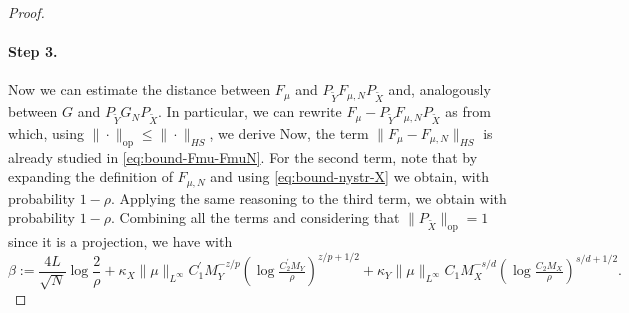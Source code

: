 \begin{proof}
\paragraph{Step 3.}
Now we can estimate the distance between $F_\mu$ and $P_{\tilde{Y}}F_{\mu,N} P_{\tilde{X}}$ and, analogously between $G$ and $P_{\tilde{Y}}G_N P_{\tilde{X}}$. In particular, we can rewrite $F_\mu - P_{\tilde{Y}}F_{\mu,N} P_{\tilde{X}}$ as
from which, using $\|\cdot\|_{\mathrm{op}} \leq \|\cdot\|_{HS}$, we derive
Now, the term $\|F_\mu - F_{\mu,N}\|_{HS}$ is already studied in \cref{eq:bound-Fmu-FmuN}. For the second term, note that by expanding the definition of $F_{\mu,N}$ and using \cref{eq:bound-nystr-X} we obtain,
with probability $1-\rho$.
Applying the same reasoning to the third term, we obtain
with probability $1-\rho$.
Combining all the terms and considering that $\|P_{\tilde{X}}\|_{\mathrm{op}} = 1$ since it is a projection, we have
with
$$ \beta := \frac{4 L}{\sqrt{N}} \log \frac{2}{\rho} + \kappa_X \|\mu\|_{L^\infty} C^\prime_1 M_Y^{-z/p} (\log \tfrac{C^\prime_2 M_Y}{\rho})^{z/p+1/2} + \kappa_Y \|\mu\|_{L^\infty} C_1 M_X^{-s/d} (\log \tfrac{C_2 M_X}{\rho})^{s/d+1/2}.$$


\end{proof}
